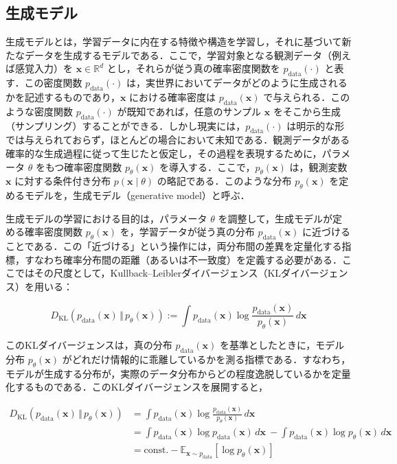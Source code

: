 \documentclass[titlepage]{ltjsbook}
\begin{document}
\subsection{生成モデル}
生成モデルとは，学習データに内在する特徴や構造を学習し，それに基づいて新たなデータを生成するモデルである．ここで，学習対象となる観測データ（例えば感覚入力）を $\mathbf{x} \in \mathbb{R}^d$ とし，それらが従う真の確率密度関数を $p_{\mathrm{data}}(\cdot)$ と表す．この密度関数 $p_{\mathrm{data}}(\cdot)$ は，実世界においてデータがどのように生成されるかを記述するものであり，$\mathbf{x}$ における確率密度は $p_{\mathrm{data}}(\mathbf{x})$ で与えられる．このような密度関数 $p_{\mathrm{data}}(\cdot)$ が既知であれば，任意のサンプル $\mathbf{x}$ をそこから生成（サンプリング）することができる．しかし現実には，$p_{\mathrm{data}}(\cdot)$ は明示的な形では与えられておらず，ほとんどの場合において未知である．観測データがある確率的な生成過程に従って生じたと仮定し，その過程を表現するために，パラメータ $\theta$ をもつ確率密度関数 $p_\theta(\mathbf{x})$ を導入する．ここで，$p_\theta(\mathbf{x})$ は，観測変数 $\mathbf{x}$ に対する条件付き分布 $p(\mathbf{x} \mid \theta)$ の略記である．このような分布 $p_\theta(\mathbf{x})$ を定めるモデルを，生成モデル（generative model）と呼ぶ．

生成モデルの学習における目的は，パラメータ $\theta$ を調整して，生成モデルが定める確率密度関数 $p_\theta(\mathbf{x})$ を，学習データが従う真の分布 $p_{\mathrm{data}}(\mathbf{x})$ に近づけることである．この「近づける」という操作には，両分布間の差異を定量化する指標，すなわち確率分布間の距離（あるいは不一致度）を定義する必要がある．ここではその尺度として，Kullback–Leiblerダイバージェンス（KLダイバージェンス）を用いる：

\begin{equation}
D_{\mathrm{KL}}\left(p_{\mathrm{data}}(\mathbf{x}) \,\Vert\, p_\theta(\mathbf{x})\right)
:= \int p_{\mathrm{data}}(\mathbf{x}) \log \frac{p_{\mathrm{data}}(\mathbf{x})}{p_\theta(\mathbf{x})} \, d\mathbf{x}
\end{equation}

このKLダイバージェンスは，真の分布 $p_{\mathrm{data}}(\mathbf{x})$ を基準としたときに，モデル分布 $p_\theta(\mathbf{x})$ がどれだけ情報的に乖離しているかを測る指標である．すなわち，モデルが生成する分布が，実際のデータ分布からどの程度逸脱しているかを定量化するものである．このKLダイバージェンスを展開すると，

\begin{align}
D_{\mathrm{KL}}\left(p_{\mathrm{data}}(\mathbf{x}) \,\Vert\, p_\theta(\mathbf{x})\right)
&= \int p_{\mathrm{data}}(\mathbf{x}) \log \frac{p_{\mathrm{data}}(\mathbf{x})}{p_\theta(\mathbf{x})} \, d\mathbf{x} \\
&= \int p_{\mathrm{data}}(\mathbf{x}) \log p_{\mathrm{data}}(\mathbf{x}) \, d\mathbf{x} 
\ - \int p_{\mathrm{data}}(\mathbf{x}) \log p_\theta(\mathbf{x}) \, d\mathbf{x} \\
&= \text{const.} - \mathbb{E}_{\mathbf{x} \sim p_{\mathrm{data}}} \left[ \log p_\theta(\mathbf{x}) \right]
\end{align}
\end{document}
